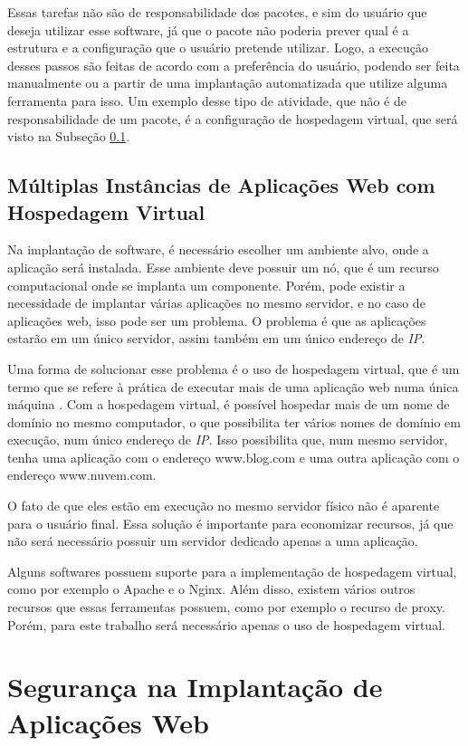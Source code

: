 Essas tarefas não são de responsabilidade dos pacotes, e sim do usuário que deseja utilizar esse
software, já que o pacote não poderia prever qual é a estrutura e a configuração
que o usuário pretende utilizar. Logo, a execução desses passos são feitas de
acordo com a preferência do usuário, podendo ser feita manualmente ou a partir
de uma implantação automatizada que utilize alguma ferramenta para isso. Um exemplo
desse tipo de atividade, que não é de responsabilidade de um pacote, é a configuração
de hospedagem virtual, que será visto na Subseção \ref{sub:multiplas}.

\subsection{Múltiplas Instâncias de Aplicações Web com Hospedagem Virtual}
\label{sub:multiplas}
Na implantação de software, é necessário escolher um ambiente alvo, onde a aplicação
será instalada. Esse ambiente deve possuir um nó, que é um recurso computacional
onde se implanta um componente. Porém, pode
existir a necessidade de implantar várias aplicações no mesmo servidor, e no caso
de aplicações web, isso pode ser um problema. O problema é que as aplicações estarão em um
único servidor, assim também em um único endereço de \textit{IP}.

Uma forma de solucionar esse problema é o uso de hospedagem virtual, que é um 
termo que se refere à prática de executar mais de uma aplicação web numa única 
máquina \cite{apachvh}. Com a hospedagem virtual, é possível
hospedar mais de um nome de domínio no mesmo computador, o que possibilita ter
vários nomes de domínio em execução, num único endereço de \textit{IP}. Isso
possibilita que, num mesmo servidor, tenha uma aplicação com o endereço
 www.blog.com e uma outra aplicação com o endereço www.nuvem.com. 

O fato de que eles estão em execução no mesmo servidor físico não é aparente 
para o usuário final. Essa solução é importante para economizar recursos, 
já que não será necessário possuir um servidor dedicado apenas a uma aplicação.

Alguns softwares possuem suporte para a implementação de hospedagem virtual, como por
exemplo o Apache e o Nginx. Além disso, existem vários
outros recursos que essas ferramentas possuem, como por exemplo o recurso de proxy.
Porém, para este trabalho será necessário apenas o uso de hospedagem virtual.

\section{Segurança na Implantação de Aplicações Web}
\label{sec:seguranca}

